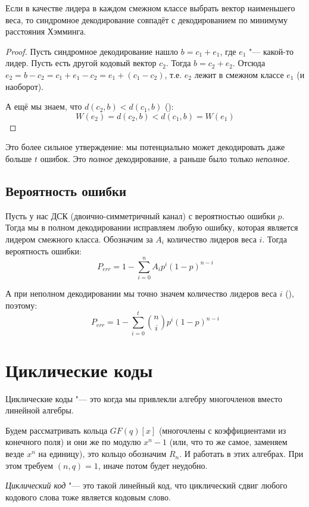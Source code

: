 \begin{theorem}
	Если в качестве лидера в каждом смежном классе выбрать
	вектор наименьшего веса, то синдромное декодирование
	совпадёт с декодированием по минимуму расстояния Хэмминга.
\end{theorem}
\begin{proof}
	Пусть синдромное декодирование нашло $b=c_1+e_1$,
	где $e_1$ "--- какой-то лидер.
	Пусть есть другой кодовый вектор $c_2$.
	Тогда $b=c_2+e_2$.
	Отсюда $e_2=b-c_2=c_1+e_1-c_2=e_1+(c_1-c_2)$,
	т.е. $e_2$ лежит в смежном классе $e_1$ (и наоборот).

	А ещё мы знаем, что $d(c_2, b) < d(c_1, b)$ (\TODO):
	\[
		W(e_2) = d(c_2, b) < d(c_1, b) = W(e_1)
	\]
\end{proof}
\begin{Rem}
	Это более сильное утверждение: мы потенциально может декодировать даже
	больше $t$ ошибок.
	Это \textit{полное} декодирование, а раньше было только \textit{неполное}.
\end{Rem}

\subsection{Вероятность ошибки}
Пусть у нас ДСК (двоично-симметричный канал) с вероятностью ошибки $p$.
Тогда мы в полном декодировании исправляем любую ошибку, которая является лидером смежного класса.
Обозначим за $A_i$ количество лидеров веса $i$.
Тогда вероятность ошибки:
\[
	P_{err} = 1 - \sum_{i=0}^n A_i p^i (1-p)^{n-i}
\]

А при неполном декодировании мы точно значем количество лидеров веса $i$
(\TODO), поэтому:
\[
	P_{err} = 1 - \sum_{i=0}^t \binom{n}{i} p^i (1-p)^{n-i}
\]

\section{Циклические коды}
Циклические коды "--- это когда мы привлекли алгебру многочленов вместо линейной алгебры.

Будем рассматривать кольца $GF(q)[x]$ (многочлены с коэффициентами из конечного поля)
и они же по модулю $x^n-1$ (или, что то же самое, заменяем везде $x^n$ на единицу), это кольцо обозначим $R_n$.
И работать в этих алгебрах.
При этом требуем $(n,q)=1$, иначе потом будет неудобно.

\begin{Def}
	\textit{Циклический код} "--- это такой линейный код,
	что циклический сдвиг любого кодового слова тоже является кодовым слово.
\end{Def}

